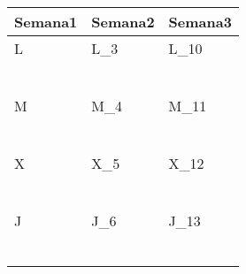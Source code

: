 \clearpage
{}


	\renewcommand{\arraystretch}{1.24}\scriptsize
	\begin{longtabu} to \textwidth { X[l] X[l] X[l]}
		\centering \textbf{Semana1} &  \centering\textbf{Semana2}  &   \centering\textbf{Semana3}  \\
		\toprule
		L & L_{3} & L_{10} \\
		  & \makebox{$\square$}\dotfill & \makebox{$\square$}\dotfill \\
		  & \dotfill & \dotfill \\
		  & \makebox{$\square$}\dotfill & \makebox{$\square$}\dotfill \\
		  & \dotfill & \dotfill \\
		  & \makebox{$\square$}\dotfill & \makebox{$\square$}\dotfill \\
		  & \dotfill & \dotfill \\

		\hline

		M & M_{4} & M_{11} \\
		  & \makebox{$\square$}\dotfill & \makebox{$\square$}\dotfill \\
		  & \dotfill & \dotfill \\
		  & \makebox{$\square$}\dotfill & \makebox{$\square$}\dotfill \\
		  & \dotfill & \dotfill \\
		  & \makebox{$\square$}\dotfill & \makebox{$\square$}\dotfill \\
		  & \dotfill & \dotfill \\

		\hline

		X & X_{5} & X_{12} \\
		  & \makebox{$\square$}\dotfill & \makebox{$\square$}\dotfill \\
		  & \dotfill & \dotfill \\
		  & \makebox{$\square$}\dotfill & \makebox{$\square$}\dotfill \\
		  & \dotfill & \dotfill \\
		  & \makebox{$\square$}\dotfill & \makebox{$\square$}\dotfill \\
		  & \dotfill & \dotfill \\

		\hline

		J & J_{6} & J_{13} \\
		  & \makebox{$\square$}\dotfill & \makebox{$\square$}\dotfill \\
		  & \dotfill & \dotfill \\
		  & \makebox{$\square$}\dotfill & \makebox{$\square$}\dotfill \\
		  & \dotfill & \dotfill \\
		  & \makebox{$\square$}\dotfill & \makebox{$\square$}\dotfill \\
		  & \dotfill & \dotfill \\


\end{longtabu}
